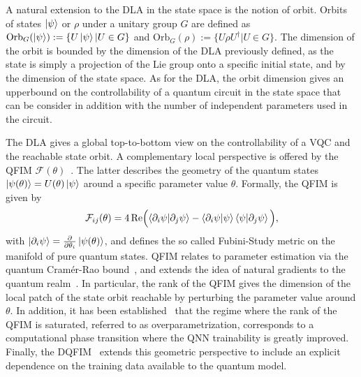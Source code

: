 \documentclass[aps,10pt,groupedaddress,prx,superscriptaddress,twocolumn,balancelastpage, tightenlines]{revtex4-2}
\theoremstyle{plain}  %
\begin{document}
A natural extension to the DLA in the state space is the notion of orbit. Orbits of states \cite{dalessandro_introduction_2021, mamon_orbit_2025} $\ket{\psi}$ or $\rho$ under a unitary group $G$ are defined as $\text{Orb}_G(\ket{\psi}) := \{U \ket{\psi} | U \in G \}$ and $\text{Orb}_G(\rho) := \{U \rho U^\dagger | U \in G \}$. The dimension of the orbit is bounded by the dimension of the DLA previously defined, as the state is simply a projection of the Lie group onto a specific initial state, and by the dimension of the state space. As for the DLA, the orbit dimension gives an upperbound on the controllability of a quantum circuit in the state space that can be consider in addition with the number of independent parameters used in the circuit.

The DLA gives a global top-to-bottom view on the controllability of a VQC and the reachable state orbit. A complementary local perspective is offered by the \gls{QFIM}  $\mathcal{F}(\theta)$~\cite{liu_quantum_2019, bengtsson2017geometry, haug2024generalization}. The latter describes the geometry of the quantum states $\ket{\psi(\theta)}= U(\theta)\ket{\psi}$ around a specific parameter value $\theta$. Formally, the QFIM is given by
\begin{equation}\label{eq:QFIM}
\mathcal{F}_{ij}(\theta) = 4 \, {\rm Re}\Big( \langle \partial_i \psi | \partial_j \psi\rangle - \braket{\partial_i \psi}{\psi}\braket{\psi}{\partial_j \psi}\Big),
\end{equation}
with $\ket{\partial_i \psi} =\frac{\partial}{\partial \theta_i} \ket{\psi(\theta)}$, and defines the so called Fubini-Study metric on the manifold of pure quantum states. QFIM relates to parameter estimation via the quantum Cram\'er-Rao bound~\cite{giovannetti2011advances}, and extends the idea of natural gradients to the quantum realm~\cite{stokes2020quantum, mcardle_variational_2019, gacon2021simultaneous}. In particular, the rank of the QFIM gives the dimension of the local patch of the state orbit reachable by perturbing the parameter value around $\theta$. In addition, it has been established~\cite{Larocca_2023} that the regime where the rank of the QFIM is saturated, referred to as overparametrization, corresponds to a computational phase transition where the QNN trainability is greatly improved. Finally, the \gls{DQFIM}~\cite{haug2024generalization} extends this geometric perspective to include an explicit dependence on the training data available to the quantum model.
\end{document}
